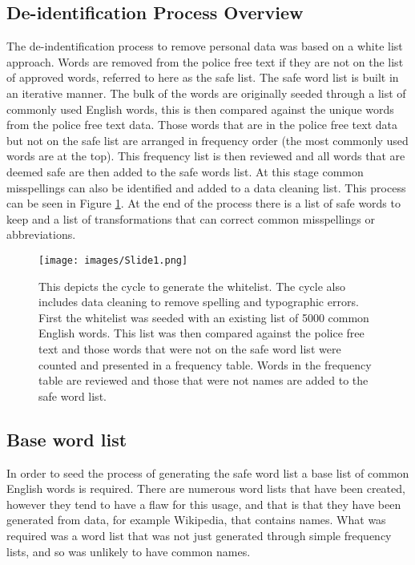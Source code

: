 \subsection{De-identification Process Overview} The de-indentification process to remove personal data was based on a white list approach. Words are removed from the police free text if they are not on the list of approved words, referred to here as the safe list. The safe word list is built in an iterative manner. The bulk of the words are originally seeded through a list of commonly used English words, this is then compared against the unique words from the police free text data. Those words that are in the police free text data but not on the safe list are arranged in frequency order (the most commonly used words are at the top). This frequency list is then reviewed and all words that are deemed safe are then added to the safe words list. At this stage common misspellings can also be identified and added to a data cleaning list. This process can be seen in Figure \ref{fig:whitelist}. At the end of the process there is a list of safe words to keep and a list of transformations that can correct common misspellings or abbreviations.


\begin{figure}[!ht]
  \centering
    \texttt{[image: images/Slide1.png]}
    \caption[Whitelist Cycle.]{This depicts the cycle to generate the whitelist. The cycle also includes data cleaning to remove spelling and typographic errors. First the whitelist was seeded with an existing list of 5000 common English words. This list was then compared against the police free text and those words that were not on the safe word list were counted and presented in a frequency table. Words in the frequency table are reviewed and those that were not names are added to the safe word list.}
    \label{fig:whitelist}
\end{figure}

\subsection{Base word list} In order to seed the process of generating the safe word list a base list of common English words is required. There are numerous word lists that have been created, however they tend to have a flaw for this usage, and that is that they have been generated from data, for example Wikipedia, that contains names. What was required was a word list that was not just generated through simple frequency lists, and so was unlikely to have common names.

